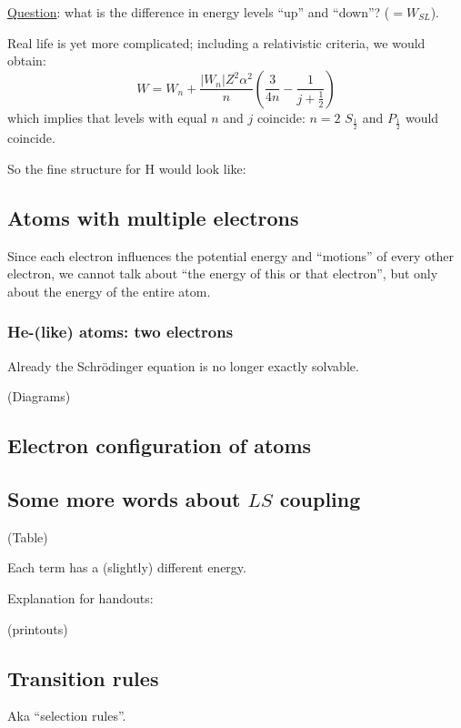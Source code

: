 \documentclass[11pt]{article}
\newcommand{\mar}[1]{\hspace{0pt}\marginpar{-\textcolor{black}{#1}-}}
\begin{document}
\mar{I 9(a)}\underline{Question}: what is the difference in energy levels
``up'' and ``down''? ($=W_{SL}$).

Real life is yet more complicated; including a relativistic criteria, we
would obtain:
\[
    W = W_{n} + \frac{ |W_{n}| Z^{2} \alpha^{2}}{n}
    \left( \frac{3}{4n} - \frac{1}{j + \frac{1}{2}} \right)
    \]
\mar{I 9(b)}which implies that levels with equal $n$ and $j$ coincide:
$n=2$ $S_{\frac{1}{2}}$ and $P_{\frac{1}{2}}$ would coincide.

So the fine structure for H would look like:

\subsection{Atoms with multiple electrons}
\mar{I 10}Since each electron influences the potential energy and ``motions''
of every other electron, we cannot talk about ``the energy of this or that
electron'', but only about the energy of the entire atom.

\subsubsection{He-(like) atoms: two electrons}
Already the Schr\"{o}dinger equation is no longer exactly solvable.

\mar{I 11}(Diagrams)

\mar{I 12}

\mar{I 13}

\subsection{Electron configuration of atoms}

\mar{I 14}

\subsection{Some more words about $LS$ coupling}

\mar{I 15}(Table)

\mar{I 16}Each term has a (slightly) different energy.

\mar{I 17}Explanation for handouts:

\mar{I 18}(printouts)

\subsection{Transition rules}
\mar{I 19}Aka ``selection rules''.
\end{document}
